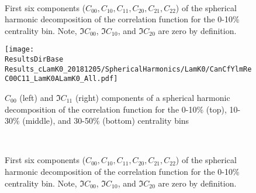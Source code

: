 \documentclass[/home/jesse/Analysis/FemtoAnalysis/AnalysisNotes/AnalysisNoteJBuxton.tex]{subfiles}
\begin{document}
\begin{figure}[h!]
  \centering
   \\
  \caption[\LamKchM First Six Components of Spherical Harmonic Decomposition (0-10\%)]{First six components ($C_{00}, C_{10}, C_{11}, C_{20}, C_{21}, C_{22}$) of the spherical harmonic decomposition of the \LamKchM correlation function for the 0-10\% centrality bin.
  Note, $\Im C_{00}$, $\Im C_{10}$, and $\Im C_{20}$ are zero by definition.}
  \label{fig:LamKchM_FirstSixCYlm}
\end{figure}













\begin{figure}[h]
  \centering
  \texttt{[image: \\ResultsDirBase Results\_cLamK0\_20181205/SphericalHarmonics/LamK0/CanCfYlmReC00C11\_LamK0ALamK0\_All.pdf]}
  \caption[\LamKs $C_{00}$ and $\Im C_{11}$ Spherical Harmonic Components]{$C_{00}$ (left) and $\Im C_{11}$ (right) components of a spherical harmonic decomposition of the \LamKs correlation function for the 0-10\% (top), 10-30\% (middle), and 30-50\% (bottom) centrality bins}
  \label{fig:LamK0_ReC00C11_All}
\end{figure}



\begin{figure}[h!]
  \centering
   \\
  \caption[\LamKs First Six Components of Spherical Harmonic Decomposition (0-10\%)]{First six components ($C_{00}, C_{10}, C_{11}, C_{20}, C_{21}, C_{22}$) of the spherical harmonic decomposition of the \LamKs correlation function for the 0-10\% centrality bin.
  Note, $\Im C_{00}$, $\Im C_{10}$, and $\Im C_{20}$ are zero by definition.}
  \label{fig:LamK0_FirstSixCYlm}
\end{figure}
\end{document}
